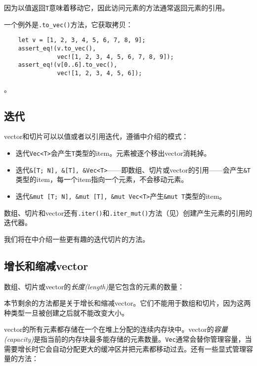 因为以值返回\texttt{T}意味着移动它，因此访问元素的方法通常返回元素的引用。

一个例外是\texttt{.to\_vec()}方法，它获取拷贝：

\begin{verbatim}
    let v = [1, 2, 3, 4, 5, 6, 7, 8, 9];
    assert_eq!(v.to_vec(),
               vec![1, 2, 3, 4, 5, 6, 7, 8, 9]);
    assert_eq!(v[0..6].to_vec(),
               vec![1, 2, 3, 4, 5, 6]);
\end{verbatim}
。

\subsection{迭代}\label{Iteration}
vector和切片可以以值或者以引用迭代，遵循中介绍的模式：
\begin{itemize}
    \item 迭代\texttt{Vec<T>}会产生\texttt{T}类型的item。元素被逐个移出vector消耗掉。
    \item 迭代\texttt{\&[T; N], \&[T], \&Vec<T>}——即数组、切片或vector的引用——会产生\texttt{\&T}类型的item，每一个item指向一个元素，不会移动元素。
    \item 迭代\texttt{\&mut [T; N], \&mut [T], \&mut Vec<T>}产生\texttt{\&mut T}类型的item。
\end{itemize}

数组、切片和vector还有\texttt{.iter()}和\texttt{.iter\_mut()}方法（见）创建产生元素的引用的迭代器。

我们将在中介绍一些更有趣的迭代切片的方法。

\subsection{增长和缩减vector}
数组、切片或vector的\emph{长度(length)}是它包含的元素的数量：



本节剩余的方法都是关于增长和缩减vector。它们不能用于数组和切片，因为这两种类型一旦被创建之后就不能改变大小。

vector的所有元素都存储在一个在堆上分配的连续内存块中。vector的\emph{容量(capacity)}是指当前的内存块最多能存储的元素数量。\texttt{Vec}通常会替你管理容量，当需要增长时它会自动分配更大的缓冲区并把元素都移动过去。还有一些显式管理容量的方法：

